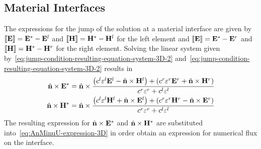 \subsection{Material Interfaces}
The expressions for the jump of the solution at a material interface are given by $\llbracket \mathbf{E} \rrbracket = \mathbf{E}^* - \mathbf{E}^l$ and $\llbracket \mathbf{H} \rrbracket = \mathbf{H}^* - \mathbf{H}^l$ for the left element and $\llbracket \mathbf{E} \rrbracket = \mathbf{E}^* - \mathbf{E}^r$ and $\llbracket \mathbf{H} \rrbracket = \mathbf{H}^* - \mathbf{H}^r$ for the right element.
Solving the linear system given by~\eqref{eq:jump-condition-resulting-equation-system-3D-2} and~\eqref{eq:jump-condition-resulting-equation-system-3D-2} results in
\begin{align}
 \hat{\mathbf{n}} \times \mathbf{E}^* = \hat{\mathbf{n}} \times \frac{
  \left( 
c^l \varepsilon^l \mathbf{E}^l - \hat{\mathbf{n}} \times \mathbf{H}^l
 \right)
  +
  \left( 
c^r \varepsilon^r \mathbf{E}^r + \hat{\mathbf{n}} \times \mathbf{H}^r
 \right)
}{
  c^r \varepsilon^r + c^l \varepsilon^l
} \label{eq:material-interfaces-1} \\
 \hat{\mathbf{n}} \times \mathbf{H}^* = \hat{\mathbf{n}} \times \frac{
  \left( 
c^l \varepsilon^l \mathbf{H}^l + \hat{\mathbf{n}} \times \mathbf{E}^l
 \right)
  +
  \left( 
c^r \varepsilon^r \mathbf{H}^r - \hat{\mathbf{n}} \times \mathbf{E}^r
 \right)
}{
  c^r \varepsilon^r + c^l \varepsilon^l
} \label{eq:material-interfaces-1}
\end{align}
The resulting expression for $\hat{\mathbf{n}} \times \mathbf{E}^*$ and $\hat{\mathbf{n}} \times \mathbf{H}^*$ are substituted into~\eqref{eq:AnMinuU-expression-3D} in order obtain an expression for numerical flux on the interface.

